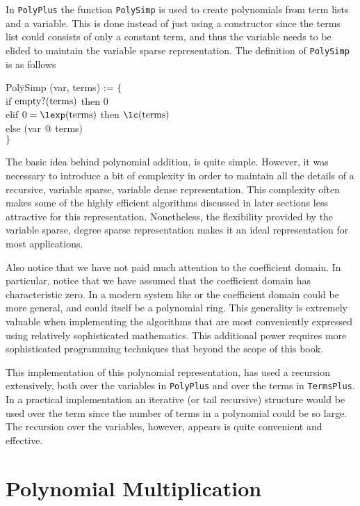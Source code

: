 In {\tt PolyPlus} the function {\tt PolySimp} is used to create
polynomials from term lists and a variable.  This is done instead of
just using a constructor since the terms list could consists of only a
constant term, and thus the variable needs to be elided to maintain
the variable sparse representation.  The definition of {\tt PolySimp}
is as follows

\begindsacode
Pol\=ySimp (var, terms) := $\{$\\
\>if $\mathop{\rm empty?}\nolimits(\mbox{terms})$ then $0$ \\
\>elif $0 = \lexp(\mbox{terms})$ then $\lc(\mbox{terms})$\\
\>else (var @ terms)\\
\> $\}$
\enddsacode

The basic idea behind polynomial addition, is quite simple.  However,
it was necessary to introduce a bit of complexity in order to maintain
all the details of a recursive, variable sparse, variable dense
representation.  This complexity often makes some of the highly efficient
algorithms discussed in later sections less attractive for this
representation.  Nonetheless, the flexibility provided by the variable
sparse, degree sparse representation makes it an ideal representation
for most applications.

Also notice that we have not paid much attention to the coefficient
domain.  In particular, notice that we have assumed that the
coefficient domain has characteristic zero.  In a modern system like
{\Axiom} \cite{Jenks92} or {\Weyl} \cite{Weyl:Ref} the coefficient
domain could be more general, and could itself be a polynomial ring.
This generality is extremely valuable when implementing the algorithms
that are most conveniently expressed using relatively sophisticated
mathematics.  This additional power requires more sophisticated
programming techniques that beyond the scope of this book.

This implementation of this polynomial representation, has used a
recursion extensively, both over the variables in {\tt PolyPlus} and
over the terms in {\tt TermsPlus}.  In a practical implementation an
iterative (or tail recursive) structure would be used over the term
since the number of terms in a polynomial could be so large.  The
recursion over the variables, however, appears is quite convenient and
effective.  

\section{Polynomial Multiplication}
\label{Poly:Mult:Sec}

